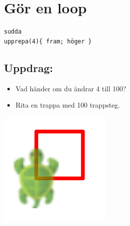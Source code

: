 \chapter{Gör en loop}
\begin{multicols}{2}

\begin{lstlisting}[basicstyle={\ttfamily\fontsize{30}{36}\selectfont},numbers=none]
sudda
upprepa(4){ fram; höger }
\end{lstlisting}
        
\section*{\color{BrickRed}Uppdrag:}


\begin{itemize}

\item {Vad händer om du ändrar 4 till 100?}
\item {Rita en trappa med 100 trappsteg.}

\end{itemize}



\columnbreak

\begin{center}
\includegraphics{../img/square.png}
\end{center}

\end{multicols}

